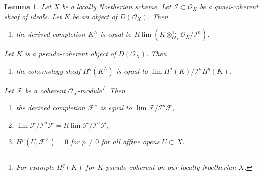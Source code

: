 \documentclass{stacks-project}
\theoremstyle{plain}
\newtheorem{lemma}[subsection]{Lemma}
\theoremstyle{definition}
\theoremstyle{remark}
\numberwithin{equation}{subsection}
\def\lim{\mathop{\mathrm{lim}}\nolimits}
\begin{document}
\begin{lemma}
\label{lemma-derived-completion-pseudo-coherent}
Let $X$ be a locally Noetherian scheme. Let $\mathcal{I} \subset \mathcal{O}_X$
be a quasi-coherent sheaf of ideals.
Let $K$ be an object of $D(\mathcal{O}_X)$. Then
\begin{enumerate}
\item the derived completion $K^\wedge$ is equal to
$R\lim (K \otimes_{\mathcal{O}_X}^\mathbf{L} \mathcal{O}_X/\mathcal{I}^n)$.
\end{enumerate}
Let $K$ is a pseudo-coherent object of $D(\mathcal{O}_X)$. Then
\begin{enumerate}
\item[(2)] the cohomology sheaf $H^q(K^\wedge)$ is equal to
$\lim H^q(K)/\mathcal{I}^nH^q(K)$.
\end{enumerate}
Let $\mathcal{F}$ be a coherent $\mathcal{O}_X$-module\footnote{For example
$H^q(K)$ for $K$ pseudo-coherent on our locally Noetherian $X$.}. Then
\begin{enumerate}
\item[(3)] the derived completion $\mathcal{F}^\wedge$ is equal to
$\lim \mathcal{F}/\mathcal{I}^n\mathcal{F}$,
\item[(4)]
$\lim \mathcal{F}/\mathcal{I}^n \mathcal{F} =
R\lim \mathcal{F}/\mathcal{I}^n \mathcal{F}$,
\item[(5)] $H^p(U, \mathcal{F}^\wedge) = 0$ for $p \not = 0$ for all
affine opens $U \subset X$.
\end{enumerate}
\end{lemma}
\end{document}
